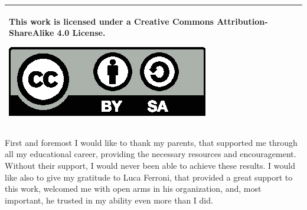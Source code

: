 \documentclass[a4paper,singleside,11pt]{report}
\begin{document}



\copertinatesi 
\begin{tabular}{|p{}|}
 \hline
 This work is licensed under a Creative Commons Attribution-ShareAlike 4.0 License.
 \begin{center}
 \includegraphics[scale=1]{by-sa.eps}
 \end{center}\\
 \hline
 \end{tabular}
\indice
\indicefigure
\indicetabelle
\iniziatesto









\appendix



\ringraziamenti

First and foremost I would like to thank my parents, that supported me through
all my educational career, providing the necessary resources and encouragement.
Without their support, I would never been able to achieve these results. I would
like also to give my gratitude to Luca Ferroni, that provided a great support to
this work, welcomed me with open arms in his organization, and, most important,
he trusted in my ability even more than I did.
\end{document}
